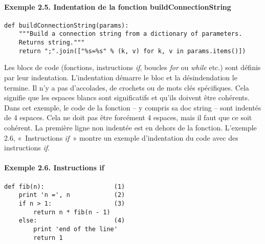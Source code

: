 \paragraph*{Exemple 2.5. Indentation de la fonction buildConnectionString}

\begin{lstlisting}
def buildConnectionString(params):
    """Build a connection string from a dictionary of parameters.
    Returns string."""
    return ";".join(["%s=%s" % (k, v) for k, v in params.items()])
\end{lstlisting}

Les blocs de code (fonctions, instructions \emph{if}, boucles \emph{for} ou \emph{while} etc.) sont définis par leur indentation. L'indentation démarre le bloc et la désindendation le termine. Il n'y a pas d'accolades, de crochets ou de mots clés spécifiques. Cela signifie que les espaces blancs sont significatifs et qu'ils doivent être cohérents. Dans cet exemple, le code de la fonction -- y compris sa doc string -- sont indentés de 4 espaces. Cela ne doit pas être forcément 4 espaces, mais il faut que ce soit cohérent. La première ligne non indentée est en dehors de la fonction.
L'exemple 2.6, «~Instructions \emph{if}~» montre un exemple d'indentation du code avec des instructions \emph{if}.

\paragraph*{Exemple 2.6. Instructions if}
\begin{lstlisting}
def fib(n):                   (1)
    print 'n =', n            (2)
    if n > 1:                 (3)
        return n * fib(n - 1)
    else:                     (4)
        print 'end of the line'
        return 1
\end{lstlisting}

